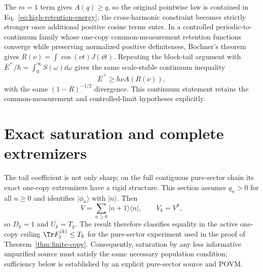 The $m=1$ term gives $A(q)\geq q$, so the original pointwise law is contained in Eq.~\eqref{eq:high-retention-energy}; the cross-harmonic constraint becomes strictly stronger once additional positive cosine terms enter.  In a controlled periodic-to-continuum family whose one-copy common-measurement retention functions converge while preserving normalized positive definiteness, Bochner's theorem gives
$R(\nu)=\int\cos(\nu t)J(\dd t)$.  Repeating the block-tail argument with
$\bar E^+/\hbar=\int_0^\infty S(\omega)\dd\omega$ gives the same scale-stable continuum inequality
\begin{equation}
 \bar E^+\geq\hbar\nu A(R(\nu)),
 \label{eq:continuum-high-retention}
\end{equation}
with the same $(1-R)^{-1/2}$ divergence.  This continuum statement retains the common-measurement and controlled-limit hypotheses explicitly.

\section{Exact saturation and complete extremizers}
\label{sec:equality}

The tail coefficient is not only sharp; on the full contiguous pure-sector chain its exact one-copy extremizers have a rigid structure.  This section assumes $q_n>0$ for all $n\geq0$ and identifies $|\phi_n\rangle$ with $|n\rangle$.  Then
\begin{equation}
 V=\sum_{n\geq0}|n+1\rangle\langle n|,
 \qquad V_k=V^k,
\end{equation}
so $D_k=1$ and $U_k=T_k$.  The result therefore classifies equality in the active one-copy ceiling $\Tr F_1^{(k)}\leq T_k$ for the pure-sector experiment used in the proof of Theorem~\ref{thm:finite-copy}.  Consequently, saturation by any less informative unpurified source must satisfy the same necessary population condition; sufficiency below is established by an explicit pure-sector source and POVM.

